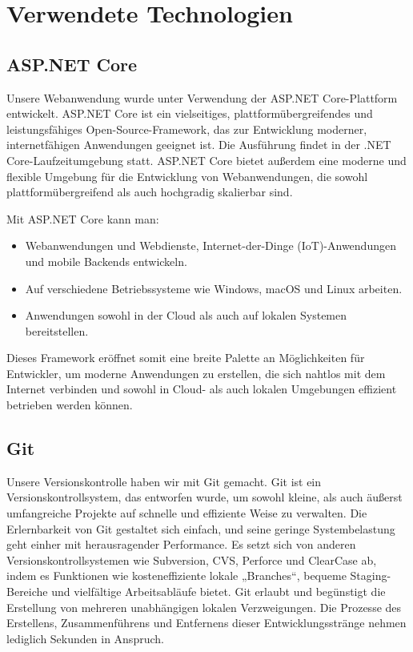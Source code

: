 \section{Verwendete Technologien}
\label{sec:tech}

\subsection*{ASP.NET Core}

Unsere Webanwendung wurde unter Verwendung der ASP.NET Core-Plattform entwickelt. 
ASP.NET Core ist ein vielseitiges, plattformübergreifendes und leistungsfähiges 
Open-Source-Framework, das zur Entwicklung moderner, internetfähigen Anwendungen geeignet ist. 
Die Ausführung findet in der .NET Core-Laufzeitumgebung statt.
ASP.NET Core bietet außerdem eine moderne und flexible Umgebung für die Entwicklung von Webanwendungen, 
die sowohl plattformübergreifend als auch hochgradig skalierbar sind. \cite{asp_dotnetcore}

Mit ASP.NET Core kann man:

\begin{itemize}

\item Webanwendungen und Webdienste, Internet-der-Dinge (IoT)-Anwendungen und 
mobile Backends entwickeln.
\item Auf verschiedene Betriebssysteme wie Windows, macOS und Linux arbeiten.
\item Anwendungen sowohl in der Cloud als auch auf lokalen Systemen bereitstellen.
\end{itemize}

Dieses Framework eröffnet somit eine breite Palette an Möglichkeiten für Entwickler, 
um moderne Anwendungen zu erstellen, die sich nahtlos mit dem Internet verbinden und 
sowohl in Cloud- als auch lokalen Umgebungen effizient betrieben werden können. \cite{asp_dotnetcore}
\newpage

\subsection*{Git}

Unsere Versionskontrolle haben wir mit Git gemacht. Git ist ein Versionskontrollsystem, 
das entworfen wurde, um sowohl kleine, als auch äußerst 
umfangreiche Projekte auf schnelle und effiziente Weise zu verwalten.
Die Erlernbarkeit von Git gestaltet sich einfach, und seine geringe Systembelastung 
geht einher mit herausragender Performance. Es setzt sich von anderen Versionskontrollsystemen 
wie Subversion, CVS, Perforce und ClearCase ab, indem es Funktionen wie kosteneffiziente 
lokale „Branches“, bequeme Staging-Bereiche und vielfältige Arbeitsabläufe bietet.
Git erlaubt und begünstigt die Erstellung von mehreren unabhängigen lokalen Verzweigungen. 
Die Prozesse des Erstellens, Zusammenführens und Entfernens dieser Entwicklungsstränge 
nehmen lediglich Sekunden in Anspruch. \cite{git_introduction} \\

